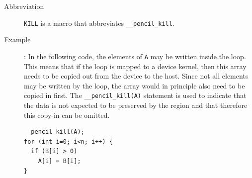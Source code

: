 \documentclass{carp}
\begin{document}
\begin{description}
\item [Abbreviation] \lstinline!KILL! is a macro that abbreviates
  \lstinline!__pencil_kill!.

\item [{Example}]:
  In the following code, the elements of \lstinline!A!
  may be written inside the loop.  This means that if the loop
  is mapped to a device kernel, then this array needs to be copied
  out from the device to the host.  Since not all elements may be
  written by the loop, the array would in principle also need to
  be copied in first.  The \lstinline!__pencil_kill(A)! statement
  is used to indicate that the data is not expected to be preserved
  by the region and that therefore this copy-in can be omitted.

\begin{lstlisting}[language=pencil]
__pencil_kill(A);
for (int i=0; i<n; i++) {
  if (B[i] > 0)
    A[i] = B[i];
}
\end{lstlisting}
\end{description}
\end{document}
